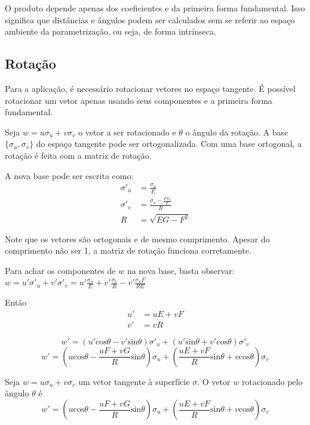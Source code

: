 O produto depende apenas dos coeficientes e da primeira forma fundamental.
Isso significa que distâncias e ângulos podem ser calculados
sem se referir ao espaço ambiente da parametrização, ou seja, de forma intrínseca.

\subsection{Rotação}
Para a aplicação, é necessário rotacionar vetores no espaço tangente.
É possível rotacionar um vetor apenas usando seus componentes e
a primeira forma fundamental.

Seja $w = u\sigma_u+v\sigma_v$ o vetor a ser rotacionado e $\theta$ o ângulo da rotação.
A base $\{\sigma_u, \sigma_v\}$ do espaço tangente pode ser ortogonalizada.
Com uma base ortogonal, a rotação é feita com a matriz de rotação.

A nova base pode ser escrita como:
\begin{align*}
    \sigma'_u &= \frac{\sigma_u}{E}\\
    \sigma'_v &= \frac{\sigma_v-\frac{F\sigma_u}{E}}{R}\\
    R &= \sqrt{EG-F^2}
\end{align*}

Note que os vetores são ortogonais e de mesmo comprimento.
Apesar do comprimento não ser 1, a matriz de rotação funciona corretamente.

Para achar os componentes de $w$ na nova base, basta observar:
$w = u'\sigma'_u+v'\sigma'_v = u'\frac{\sigma_u}{E} + v'\frac{\sigma_v}{R}-v'\frac{\sigma_uF}{RE}$

Então
\begin{align*}
    u' &= uE + vF\\
    v' &= vR
\end{align*}

\[w' = \left(u'\text{cos}\theta-v'\text{sin}\theta\right)\sigma'_u + \left(u'\text{sin}\theta+v'\text{cos}\theta\right)\sigma'_v\]
\[w' = \left(u\text{cos}\theta-\frac{uF+vG}{R}\text{sin}\theta\right)\sigma_u+\left(\frac{uE+vF}{R}\text{sin}\theta+v\text{cos}\theta\right)\sigma_v\]


\begin{defSurfRotate}
Seja $w = u\sigma_u+v\sigma_v$ um vetor tangente à superfície $\sigma$.
O vetor $w$ rotacionado pelo ângulo $\theta$ é
\[w' = \left(u\text{cos}\theta-\frac{uF+vG}{R}\text{sin}\theta\right)\sigma_u+\left(\frac{uE+vF}{R}\text{sin}\theta+v\text{cos}\theta\right)\sigma_v\]
\end{defSurfRotate}

